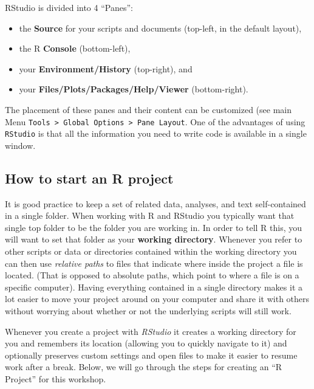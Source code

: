 \documentclass[
]{book}
\providecommand{\tightlist}{%
  \setlength{\itemsep}{0pt}\setlength{\parskip}{0pt}}
\begin{document}
RStudio is divided into 4 ``Panes'':

\begin{itemize}
\tightlist
\item
  the \textbf{Source} for your scripts and documents (top-left, in the
  default layout),
\item
  the R \textbf{Console} (bottom-left),
\item
  your \textbf{Environment/History} (top-right), and
\item
  your \textbf{Files/Plots/Packages/Help/Viewer} (bottom-right).
\end{itemize}

The placement of these panes and their content can be customized (see
main Menu \texttt{Tools\ \textgreater{}\ Global\ Options\ \textgreater{}\ Pane\ Layout}. One of the advantages
of using \texttt{RStudio} is that all the information you need to write code is
available in a single window.

\hypertarget{how-to-start-an-r-project}{%
\subsection{How to start an R project}\label{how-to-start-an-r-project}}

It is good practice to keep a set of related data, analyses, and text
self-contained in a single folder. When working with R and RStudio you
typically want that single top folder to be the folder you are working
in. In order to tell R this, you will want to set that folder as your
\textbf{working directory}. Whenever you refer to other scripts or data or
directories contained within the working directory you can then use
\emph{relative paths} to files that indicate where inside the project a file
is located. (That is opposed to absolute paths, which point to where a
file is on a specific computer). Having everything contained in a single
directory makes it a lot easier to move your project around on your
computer and share it with others without worrying about whether or not
the underlying scripts will still work.

Whenever you create a project with \emph{RStudio} it creates a working
directory for you and remembers its location (allowing you to quickly
navigate to it) and optionally preserves custom settings and open files
to make it easier to resume work after a break. Below, we will go
through the steps for creating an ``R Project'' for this workshop.
\end{document}
